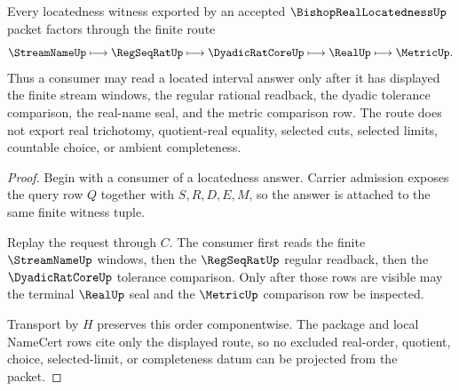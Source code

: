 \begin{theorem}
\label{thm:bishop-real-locatedness-regseqrat-witness-route}
Every locatedness witness exported by an accepted $\BishopRealLocatednessUp$ packet factors through the finite route
$$
\StreamNameUp \longmapsto \RegSeqRatUp \longmapsto \DyadicRatCoreUp \longmapsto \RealUp \longmapsto \MetricUp .
$$
Thus a consumer may read a located interval answer only after it has displayed the finite stream windows, the regular rational readback, the dyadic tolerance comparison, the real-name seal, and the metric comparison row. The route does not export real trichotomy, quotient-real equality, selected cuts, selected limits, countable choice, or ambient completeness.
\end{theorem}
\begin{proof}
Begin with a consumer of a locatedness answer. Carrier admission exposes the query row $Q$ together with $S,R,D,E,M$, so the answer is attached to the same finite witness tuple.

Replay the request through $C$. The consumer first reads the finite $\StreamNameUp$ windows, then the $\RegSeqRatUp$ regular readback, then the $\DyadicRatCoreUp$ tolerance comparison. Only after those rows are visible may the terminal $\RealUp$ seal and the $\MetricUp$ comparison row be inspected.

Transport by $H$ preserves this order componentwise. The package and local NameCert rows cite only the displayed route, so no excluded real-order, quotient, choice, selected-limit, or completeness datum can be projected from the packet.
\end{proof}




